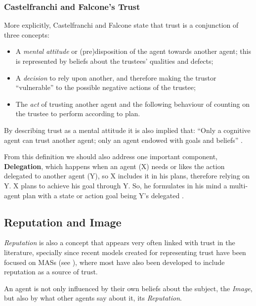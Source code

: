 \subsubsection{Castelfranchi and Falcone's Trust}
\label{subsubsec:CastelfranchiTrust}
More explicitly, Castelfranchi and Falcone \cite{Castelfranchi1998} state that trust is a conjunction of three concepts:
\begin{itemize}
	\item A \textit{mental attitude} or (pre)disposition of the agent towards another agent; this is represented by beliefs about the trustees' qualities and defects;
	\item A \textit{decision} to rely upon another, and therefore making the trustor ``vulnerable'' to the possible negative actions of the trustee;
	\item The \textit{act} of trusting another agent and the following behaviour of counting on the trustee to perform according to plan. 
\end{itemize}
By describing trust as a mental attitude it is also implied that: ``Only a cognitive agent can trust another agent; only an agent endowed with goals and beliefs'' \cite{Castelfranchi2010}.

From this definition we should also address one important component, \textbf{Delegation}, which happens when an agent (X) needs or likes the action delegated to another agent (Y), so X includes it in his plans, therefore relying on Y. X plans to achieve his goal through Y. So, he formulates in his mind a multi-agent plan with a state or action goal being Y’s delegated \cite{Castelfranchi1998}.



\subsection{Reputation and Image}
\label{subsec:Reputation}
\textit{Reputation} is also a concept that appears very often linked with trust in the literature, specially since recent models created for representing trust have been focused on \acp{MAS} (see \cite{Abdul-rahman2000, Sabater2002, Sabater2006, Huynh2006, Pinyol2009}), where most have also been developed to include reputation as a source of trust.

An agent is not only influenced by their own beliefs about the subject, the \textit{Image}, but also by what other agents say about it, its \textit{Reputation}.

